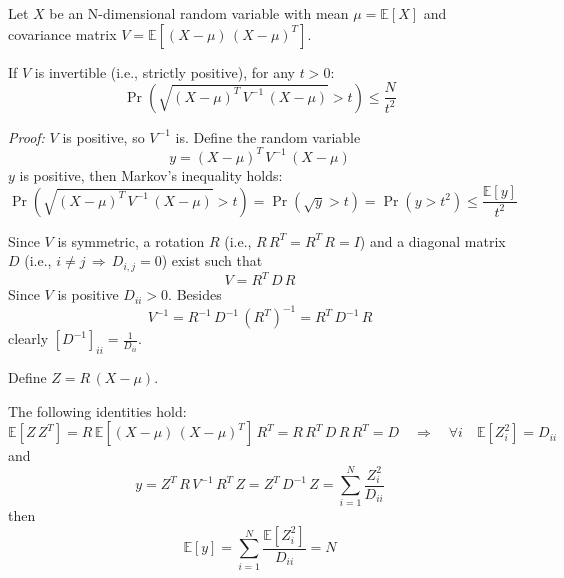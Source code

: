 \documentclass[12pt]{article}
\begin{document}
Let $X$ be an N-dimensional random variable with mean $\mu=\mathbb{E}[X]$ and covariance matrix $V=\mathbb{E}\left[ \left( X-\mu\right) \, \left( X-\mu\right)^T\right]$.

If $V$ is invertible (i.e., strictly positive), for any $t>0$:
\[ \Pr\left( \sqrt{\left( X-\mu\right)^T \, V^{-1} \, \left( X-\mu\right) } > t \right) \le \frac{N}{t^2} \]

{\em Proof:}
$V$ is positive, so $V^{-1}$ is.
Define the random variable
\[ y = \left( X-\mu\right)^T \, V^{-1} \, \left( X-\mu\right) \]
$y$ is positive, then Markov's inequality holds:
\[ \Pr\left( \sqrt{\left( X-\mu\right)^T \, V^{-1} \, \left( X-\mu\right) } > t\right) = \Pr\left( \sqrt{y} > t\right) =\Pr\left( y > t^2 \right) \le \frac{\mathbb{E}[y]}{t^2} \]

Since $V$ is symmetric, a rotation $R$ (i.e., $R\, R^T = R^T\, R = I$) and a diagonal matrix $D$ (i.e., $i\neq j \, \Rightarrow \, D_{i,j}=0$) exist such that
\[ V = R^T \, D \, R \]
Since $V$ is positive $D_{ii}>0$.
Besides
\[ V^{-1} = R^{-1} \, D^{-1} \, (R^T)^{-1} = R^T \, D^{-1} \, R \]
clearly $\left[ D^{-1}\right]_{ii} = \frac{1}{D_{ii}}$.

Define $Z = R \, \left( X-\mu\right)$.

The following identities hold:
\[ \mathbb{E}\left[ Z \, Z^T \right] = R \,\mathbb{E}\left[ \left( X-\mu\right) \, \left( X-\mu\right)^T \right] \, R^T  = R \, R^T \, D \, R \, R^T = D  \quad \Rightarrow \quad \forall i \quad \mathbb{E}\left[ Z_i^2 \right] = D_{ii} \]
and
\[ y = Z^T \, R \, V^{-1} \, R^T \, Z = Z^T \, D^{-1} \, Z = \sum\limits_{i=1}^N \frac{Z_i^2}{D_{ii}} \]
then
\[ \mathbb{E} [y] = \sum\limits_{i=1}^N \frac{\mathbb{E}\left[ Z_i^2 \right] }{D_{ii}} = N \]
\end{document}
